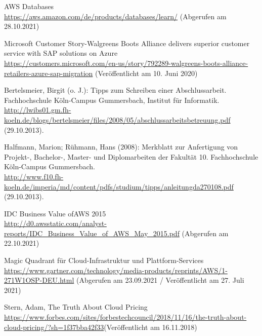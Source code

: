 \begin{thebibliography}{HR08}
   AWS Databases\\
  \url{https://aws.amazon.com/de/products/databases/learn/}
  (Abgerufen am 28.10.2021)

   Microsoft Customer Story-Walgreens Boots Alliance delivers superior customer service with SAP solutions on Azure \\
  \url{https://customers.microsoft.com/en-us/story/792289-walgreens-boots-alliance-retailers-azure-sap-migration}
  (Veröffentlicht am 10. Juni 2020)

  Bertelsmeier, Birgit (o. J.): Tipps zum Schrei\-b\-en ei\-n\-er Ab\-sch\-luss\-ar\-beit. Fach\-hoch\-schu\-le Köln-Campus Gummersbach, Institut für Informatik. \\
  \url{http://lwibs01.gm.fh-koeln.de/blogs/bertelsmeier/files/2008/05/abschlussarbeitsbetreuung.pdf} (29.10.2013).

   Halfmann, Marion; Rühmann, Hans (2008): Merkblatt zur Anfertigung von Projekt-, Bachelor-, Master- und Diplomarbeiten der Fakultät 10. Fachhochschule Köln-Campus Gummersbach. \\
  \url{http://www.f10.fh-koeln.de/imperia/md/content/pdfs/studium/tipps/anleitungda270108.pdf} (29.10.2013).

   IDC Business Value ofAWS 2015\\
 \url{http://d0.awsstatic.com/analyst-reports/IDC_Business_Value_of_AWS_May_2015.pdf}
 (Abgerufen am 22.10.2021)

  Magic Quadrant für Cloud-Infrastruktur und Plattform-Services \\
  \url{https://www.gartner.com/technology/media-products/reprints/AWS/1-271W1OSP-DEU.html}
  (Abgerufen am 23.09.2021 / Veröffentlicht am 27. Juli 2021)


  Stern, Adam, The Truth About Cloud Pricing \\
  \url{https://www.forbes.com/sites/forbestechcouncil/2018/11/16/the-truth-about-cloud-pricing/?sh=1f37bba42f33}(Veröffentlicht am 16.11.2018)

  

  
\end{thebibliography}

